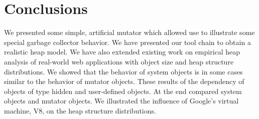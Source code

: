 
\section{Conclusions}

We presented some simple, artificial mutator which allowed use to illustrate some special garbage collector behavior. We have presented our tool chain to obtain a realistic \JS heap model. We have also extended existing work on empirical \JS heap analysis of real-world web applications with object size and heap structure distributions. We showed that the behavior of system objects is in some cases similar to the behavior of mutator objects. These results of the dependency of objects of type hidden and user-defined objects. At the end compared system objects and mutator objects. We illustrated the influence of Google's \JS virtual machine, V8, on the heap structure distributions.
